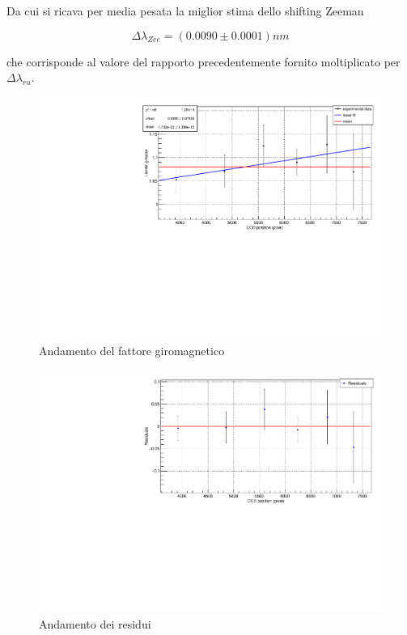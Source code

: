 \documentclass{article}
\begin{document}
	Da cui si ricava per media pesata la miglior stima dello shifting Zeeman

	\[
		\Delta\lambda_{Zee} = (0.0090 \pm 0.0001) nm	
	\]

	che corrisponde al valore del rapporto precedentemente fornito moltiplicato per $\Delta\lambda_{ru}$.

	\begin{center}
		\begin{figure}[H]
			\centering
			\includegraphics[scale=0.38, angle=0]{campomin/g.pdf}
			\setlength{\belowcaptionskip}{-20pt}
			\caption{Andamento del fattore giromagnetico}
			\label{fig:g_min}
		\end{figure}
	\end{center}

	\begin{center}
		\begin{figure}[H]
			\centering
			\includegraphics[scale=0.38, angle=0]{campomin/g_residuals.pdf}
			\setlength{\belowcaptionskip}{-20pt}
			\caption{Andamento dei residui}
			\label{fig:g_res_min}
		\end{figure}
	\end{center}
\end{document}
